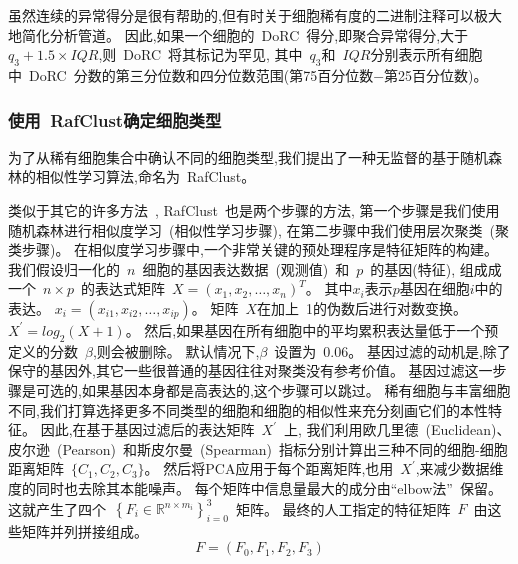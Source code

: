 虽然连续的异常得分是很有帮助的,但有时关于细胞稀有度的二进制注释可以极大地简化分析管道。
因此,如果一个细胞的~DoRC~得分,即聚合异常得分,大于~$q_3 + 1.5 \times IQR$,则~DoRC~将其标记为罕见,
其中~$q_3$和~$IQR$分别表示所有细胞中~DoRC~分数的第三分位数和四分位数范围(第75百分位数$-$第25百分位数)。

\subsubsection{使用~RafClust确定细胞类型}
\label{subsec:rafclust} 
为了从稀有细胞集合中确认不同的细胞类型,我们提出了一种无监督的基于随机森林的相似性学习算法,命名为~RafClust。

类似于其它的许多方法~\cite{kiselev2017sc3,pouyan2018random,mohammadi2018geometric,sinha2018dropclust,Srinivasan511626,Li530378,zheng2019sinnlrr},
RafClust~也是两个步骤的方法,
第一个步骤是我们使用随机森林进行相似度学习~(相似性学习步骤),
在第二步骤中我们使用层次聚类~(聚类步骤)。
在相似度学习步骤中,一个非常关键的预处理程序是特征矩阵的构建。
我们假设归一化的~$n$~细胞的基因表达数据~(观测值)~和~$p$~的基因(特征),
组成成一个~$n \times p$~的表达式矩阵~$X=\left(x_{1}, x_{2}, \ldots, x_{n} \right)^ T$。
其中$x_{i}$表示$p$基因在细胞$i$中的表达。
$x_{i}=\left(x_{i1}, x_{i2} ,\ldots, x_{ip} \right)$。
矩阵~$X$在加上~1的伪数后进行对数变换。
$X^{\prime} = log_2 (X + 1)$。
然后,如果基因在所有细胞中的平均累积表达量低于一个预定义的分数~$\beta$,则会被删除。
默认情况下,$\beta$~设置为~0.06。 
基因过滤的动机是,除了保守的基因外,其它一些很普通的基因往往对聚类没有参考价值。
基因过滤这一步骤是可选的,如果基因本身都是高表达的,这个步骤可以跳过。
稀有细胞与丰富细胞不同,我们打算选择更多不同类型的细胞和细胞的相似性来充分刻画它们的本性特征。
因此,在基于基因过滤后的表达矩阵~$X^{\prime}$~上,
我们利用欧几里德~(Euclidean)、皮尔逊~(Pearson)~和斯皮尔曼~(Spearman)~指标分别计算出三种不同的细胞-细胞距离矩阵~$\{C_1, C_2, C_3\}$。
然后将PCA应用于每个距离矩阵,也用~$X^{\prime}$,来减少数据维度的同时也去除其本能噪声。
每个矩阵中信息量最大的成分由``elbow法''~\cite{thorndike1953belongs}保留。
这就产生了四个~$\left\{ {F}_{i} \in \mathbb {R} ^ {n \times m_{i}} \right\}_{i = 0}^{3}$~矩阵。
最终的人工指定的特征矩阵~$F$~由这些矩阵并列拼接组成。
\begin{equation}
\label{lab:f}
{F} = ({F}_{0}, {F}_{1}, {F}_{2}, {F}_{3})
\end{equation}

